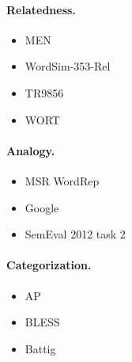 \documentclass{article}
\begin{document}
    \paragraph{Relatedness.}
    
    \begin{itemize}
        \item MEN~\cite{bruni2012distributional}
        \item WordSim-353-Rel~\cite{zesch2008using}
        \item TR9856~\cite{levy2015tr9856}
        \item WORT~\cite{eindor2018semantic}
    \end{itemize}
    
    \paragraph{Analogy.}
    
    \begin{itemize}
        \item MSR WordRep~\cite{gao2014wordrep}
        \item Google~\cite{mikolov2013distributed}
        \item SemEval 2012 task 2~\cite{jurgens2012semeval}
    \end{itemize}
    
    \paragraph{Categorization.}
    
    \begin{itemize}
        \item AP~\cite{almuhareb2005concept}
        \item BLESS~\cite{baroni2011we}
        \item Battig~\cite{battig1969category}
    \end{itemize}


    
    
%    
\end{document}
